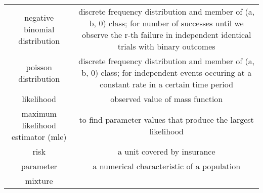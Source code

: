 \documentclass[]{book}
\theoremstyle{definition}
\theoremstyle{definition}
\theoremstyle{definition}
\theoremstyle{remark}
\begin{document}
\begin{longtable}[]{@{}cc@{}}
\begin{minipage}[t]{0.43\columnwidth}
negative binomial distribution\strut
\end{minipage} & \begin{minipage}[t]{0.43\columnwidth}\centering\strut
discrete frequency distribution and member of (a, b, 0) class; for
number of successes until we observe the r-th failure in independent
identical trials with binary outcomes\strut
\end{minipage}\tabularnewline
\begin{minipage}[t]{0.43\columnwidth}\centering\strut
poisson distribution\strut
\end{minipage} & \begin{minipage}[t]{0.43\columnwidth}\centering\strut
discrete frequency distribution and member of (a, b, 0) class; for
independent events occuring at a constant rate in a certain time
period\strut
\end{minipage}\tabularnewline
\begin{minipage}[t]{0.43\columnwidth}\centering\strut
likelihood\strut
\end{minipage} & \begin{minipage}[t]{0.43\columnwidth}\centering\strut
observed value of mass function\strut
\end{minipage}\tabularnewline
\begin{minipage}[t]{0.43\columnwidth}\centering\strut
maximum likelihood estimator (mle)\strut
\end{minipage} & \begin{minipage}[t]{0.43\columnwidth}\centering\strut
to find parameter values that produce the largest likelihood\strut
\end{minipage}\tabularnewline
\begin{minipage}[t]{0.43\columnwidth}\centering\strut
risk\strut
\end{minipage} & \begin{minipage}[t]{0.43\columnwidth}\centering\strut
a unit covered by insurance\strut
\end{minipage}\tabularnewline
\begin{minipage}[t]{0.43\columnwidth}\centering\strut
parameter\strut
\end{minipage} & \begin{minipage}[t]{0.43\columnwidth}\centering\strut
a numerical characteristic of a population\strut
\end{minipage}\tabularnewline
\begin{minipage}[t]{0.43\columnwidth}\centering\strut
mixture\strut
\end{minipage} & \begin{minipage}[t]{0.43\columnwidth}\centering\strut

\end{minipage}
\end{longtable}
\end{document}
